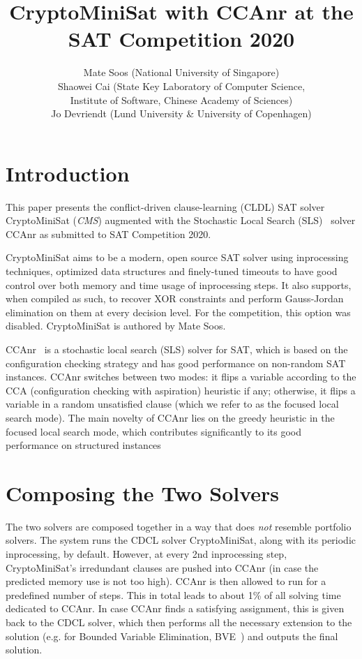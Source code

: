 \documentclass[final]{ieee}
\begin{document}
\title{CryptoMiniSat with CCAnr at the SAT Competition 2020}
\author{Mate Soos (National University of Singapore)\\
Shaowei Cai (State Key Laboratory of Computer Science,\\Institute of Software, Chinese Academy of Sciences)\\Jo Devriendt (Lund University \& University of Copenhagen)}

\maketitle
\thispagestyle{empty}
\pagestyle{empty}

\section{Introduction}
This paper presents the conflict-driven clause-learning (CLDL) SAT solver CryptoMiniSat (\emph{CMS}) augmented with the Stochastic Local Search (SLS)~\cite{DBLP:conf/sat/CaiLS15} solver CCAnr as submitted to SAT Competition 2020.

CryptoMiniSat aims to be a modern, open source SAT solver using inprocessing techniques, optimized data structures and finely-tuned timeouts to have good control over both memory and time usage of inprocessing steps. It also supports, when compiled as such, to recover XOR constraints and perform Gauss-Jordan elimination on them at every decision level. For the competition, this option was disabled. CryptoMiniSat is authored by Mate Soos.

CCAnr~\cite{DBLP:conf/sat/CaiLS15} is a stochastic local search (SLS) solver for SAT, which is based on the configuration checking strategy and has good performance on non-random SAT instances. CCAnr switches between two modes: it flips a variable according to the CCA (configuration checking with aspiration) heuristic if any; otherwise, it flips a variable in a random unsatisfied clause (which we refer to as the focused local search mode). The main novelty of CCAnr lies on the greedy heuristic in the focused local search mode, which contributes significantly to its good performance on structured instances

\section{Composing the Two Solvers}
The two solvers are composed together in a way that does \emph{not} resemble portfolio solvers. The system runs the CDCL solver CryptoMiniSat, along with its periodic inprocessing, by default. However, at every 2nd inprocessing step, CryptoMiniSat's irredundant clauses are pushed into CCAnr (in case the predicted memory use is not too high). CCAnr is then allowed to run for a predefined number of steps. This in total leads to about 1\% of all solving time dedicated to CCAnr. In case CCAnr finds a satisfying assignment, this is given back to the CDCL solver, which then performs all the necessary extension to the solution (e.g. for Bounded Variable Elimination, BVE~\cite{BVE}) and outputs the final solution.
\end{document}
